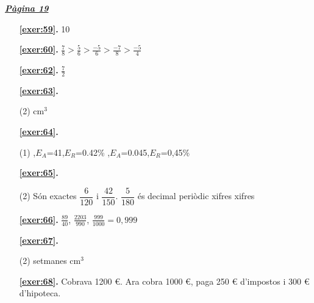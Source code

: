 \hyperlink{page.19}{\textbf{\em Pàgina 19}}
\begin{enumerate}
\item[\fontfamily{phv}\selectfont\color{blue}\textbf{\ref{exer:59}. }] \label{ans:59} 
10
 \end{enumerate}
\begin{enumerate}
\item[\fontfamily{phv}\selectfont\color{blue}\textbf{\ref{exer:60}. }] \label{ans:60} 
$\frac {7}{8}>\frac {5}{6}>\frac {-5}{6}>\frac {-7}{8}>\frac {-5}{4}$
\item[\fontfamily{phv}\selectfont\color{blue}\textbf{\ref{exer:62}. }] \label{ans:62} 
$\frac {7}{2}$



 \item[\fontfamily{phv}\selectfont\color{blue}\textbf{\ref{exer:63}. }] \label{ans:63}
 \begin{tasks}[column-sep=1em, item-indent=1.3333em](2)
	  cm${}^3$
\end{tasks}



 \item[\fontfamily{phv}\selectfont\color{blue}\textbf{\ref{exer:64}. }] \label{ans:64}
 \begin{tasks}[column-sep=1em, item-indent=1.3333em](1)
	 ,$E_A$=41,$E_R$=0.42\%
	 ,$E_A$=0.045,$E_R$=0,45\% 
\end{tasks}



 \item[\fontfamily{phv}\selectfont\color{blue}\textbf{\ref{exer:65}. }] \label{ans:65}
 \begin{tasks}[column-sep=1em, item-indent=1.3333em](2)
	 \task* Són exactes $\dfrac {6}{120}$ i $\dfrac {42}{150}$. $\dfrac {5}{180}$ és decimal periòdic
	  xifres
	  xifres
\end{tasks}
\item[\fontfamily{phv}\selectfont\color{blue}\textbf{\ref{exer:66}. }] \label{ans:66} 
$\frac {89}{40}$, $\frac {2203}{990}$, $\frac {999}{1000}=0,999$



 \item[\fontfamily{phv}\selectfont\color{blue}\textbf{\ref{exer:67}. }] \label{ans:67}
 \begin{tasks}[column-sep=1em, item-indent=1.3333em](2)
	  setmanes
	  cm${}^{3}$
\end{tasks}
\item[\fontfamily{phv}\selectfont\color{blue}\textbf{\ref{exer:68}. }] \label{ans:68} 
Cobrava 1200 \euro {}. Ara cobra 1000 \euro {}, paga 250 \euro {} d'impostos i 300 \euro {} d'hipoteca. 
 \end{enumerate}

